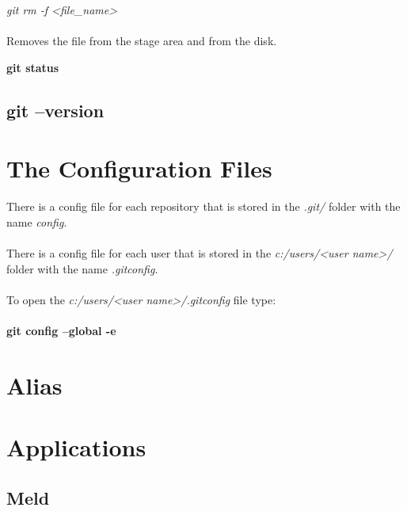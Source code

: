 \emph{git rm -f <file\_name>}\\
\\
Removes the file from the stage area and from the disk.


\textbf{git status}

\subsection{git --version}

\section{The Configuration Files}

There is a config file for each repository that is stored in the \emph{.git/} folder with the name \emph{config}.\\
\\
There is a config file for each user that is stored in the \emph{c:/users/<user name>/} folder with the name \emph{.gitconfig}.\\
\\
To open the \emph{c:/users/<user name>/.gitconfig} file type:\\
\\
\textbf{git config --global -e}

\section{Alias}

\section{Applications}

\subsection{Meld}

%
%
%	
%
%
%
%

